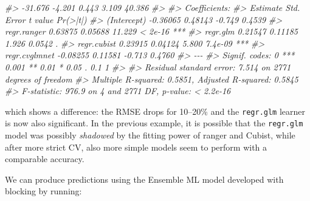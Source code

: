 \documentclass[
  graybox,natbib,nospthms]{svmono}
\newenvironment{Shaded}{\begin{snugshade}}{\end{snugshade}}
\newcommand{\AttributeTok}[1]{\textcolor[rgb]{0.61,0.61,0.61}{#1}}
\newcommand{\CommentTok}[1]{\textcolor[rgb]{0.37,0.37,0.37}{\textit{#1}}}
\newcommand{\FunctionTok}[1]{\textcolor[rgb]{0,0,0}{#1}}
\newcommand{\NormalTok}[1]{#1}
\newcommand{\OtherTok}[1]{\textcolor[rgb]{0.37,0.37,0.37}{#1}}
\newcommand{\SpecialCharTok}[1]{\textcolor[rgb]{0,0,0}{#1}}
\begin{document}
\begin{Shaded}
\begin{Highlighting}[]
\CommentTok{\#\textgreater{} {-}31.676  {-}4.201   0.443   3.109  40.386 }
\CommentTok{\#\textgreater{} }
\CommentTok{\#\textgreater{} Coefficients:}
\CommentTok{\#\textgreater{}               Estimate Std. Error t value Pr(\textgreater{}|t|)    }
\CommentTok{\#\textgreater{} (Intercept)   {-}0.36065    0.48143  {-}0.749   0.4539    }
\CommentTok{\#\textgreater{} regr.ranger    0.63875    0.05688  11.229  \textless{} 2e{-}16 ***}
\CommentTok{\#\textgreater{} regr.glm       0.21547    0.11185   1.926   0.0542 .  }
\CommentTok{\#\textgreater{} regr.cubist    0.23915    0.04124   5.800  7.4e{-}09 ***}
\CommentTok{\#\textgreater{} regr.cvglmnet {-}0.08255    0.11581  {-}0.713   0.4760    }
\CommentTok{\#\textgreater{} {-}{-}{-}}
\CommentTok{\#\textgreater{} Signif. codes:  0 \textquotesingle{}***\textquotesingle{} 0.001 \textquotesingle{}**\textquotesingle{} 0.01 \textquotesingle{}*\textquotesingle{} 0.05 \textquotesingle{}.\textquotesingle{} 0.1 \textquotesingle{} \textquotesingle{} 1}
\CommentTok{\#\textgreater{} }
\CommentTok{\#\textgreater{} Residual standard error: 7.514 on 2771 degrees of freedom}
\CommentTok{\#\textgreater{} Multiple R{-}squared:  0.5851, Adjusted R{-}squared:  0.5845 }
\CommentTok{\#\textgreater{} F{-}statistic: 976.9 on 4 and 2771 DF,  p{-}value: \textless{} 2.2e{-}16}
\end{Highlighting}
\end{Shaded}

which shows a difference: the RMSE drops for 10--20\% and the \texttt{regr.glm} learner is
now also significant. In the previous example, it is possible that the \texttt{regr.glm} model
was possibly \emph{shadowed} by the fitting power of ranger and Cubist, while after
more strict CV, also more simple models seem to perform with a comparable accuracy.

We can produce predictions using the Ensemble ML model developed with blocking by running:

\begin{Shaded}
\end{Shaded}
\end{document}
